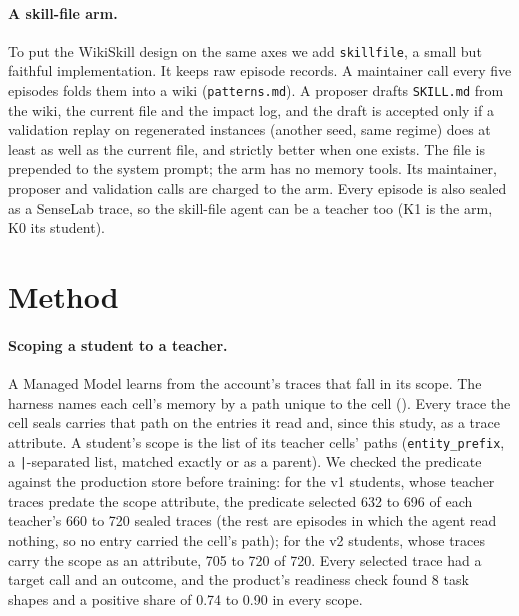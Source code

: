 \documentclass[11pt]{article}
\newcommand{\arm}[1]{\texttt{#1}}
\newcommand{\cond}[1]{\textsf{#1}}
\begin{document}
\paragraph{A skill-file arm.} To put the WikiSkill design on the same axes we add
\arm{skillfile}, a small but faithful implementation. It keeps raw episode records. A
maintainer call every five episodes folds them into a wiki (\texttt{patterns.md}). A
proposer drafts \texttt{SKILL.md} from the wiki, the current file and the impact log, and
the draft is accepted only if a validation replay on regenerated instances (another seed,
same regime) does at least as well as the current file, and strictly better when one
exists. The file is prepended to the system prompt; the arm has no memory tools. Its
maintainer, proposer and validation calls are charged to the arm. Every episode is also
sealed as a SenseLab trace, so the skill-file agent can be a teacher too (\cond{K1} is the
arm, \cond{K0} its student).

\section{Method}
\label{sec:method}

\paragraph{Scoping a student to a teacher.} A Managed Model learns from the account's traces
that fall in its scope. The harness names each cell's memory by a path unique to the cell
(). Every trace the cell seals carries that
path on the entries it read and, since this study, as a trace attribute. A student's scope
is the list of its teacher cells' paths (\texttt{entity\_prefix}, a \texttt{|}-separated
list, matched exactly or as a parent). We checked the predicate against the production
store before training: for the v1 students, whose teacher traces predate the scope attribute, the predicate selected 632 to 696 of each teacher's 660 to 720 sealed traces (the rest are episodes in which the agent read nothing, so no entry carried the cell's path); for the v2 students, whose traces carry the scope as an attribute, 705 to 720 of 720. Every selected trace had a target call and an outcome, and the product's readiness check found 8 task shapes and a positive share of 0.74 to 0.90 in every scope.
\end{document}
